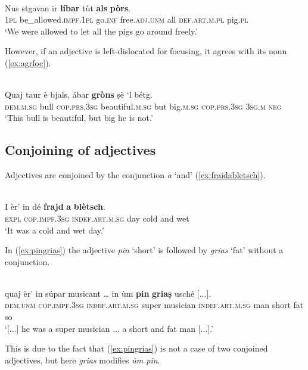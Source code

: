 \ea
\label{ex:noagr:7}
\\
\gll Nus stgavan ir \textbf{líbar} tùt \textbf{als} \textbf{pòrs}.   \\
 \textsc{1pl} be\_allowed.\textsc{impf.1pl}  go.\textsc{inf} free.\textsc{adj.unm} all  \textsc{def.art.m.pl} pig.\textsc{pl} \\
\glt `We were allowed to let all the pigs go around freely.'
\z

However, if an adjective is left-dislocated for focusing, it agrees with its noun (\ref{ex:agrfoc}).

\ea
\label{ex:agrfoc}
\\
\gll Quaj taur è bjals, ábar \textbf{gròns} ṣè `l bétg.\\
\textsc{dem.m.sg} bull \textsc{cop.prs.3sg} beautiful.\textsc{m.sg} but big.\textsc{m.sg} \textsc{cop.prs.3sg} \textsc{3sg.m} \textsc{neg}\\
\glt `This bull is beautiful, but big he is not.'
\z

\subsection{Conjoining of adjectives}
Adjectives are conjoined by the conjunction \textit{a} `and' (\ref{ex:fraidabletsch}).

\ea
\label{ex:fraidabletsch}
\\
\gll I èr' in dé \textbf{frajd} \textbf{a} \textbf{blètsch}.\\
\textsc{expl} \textsc{cop.impf.3sg} \textsc{indef.art.m.sg} day cold and wet\\
\glt `It was a cold and wet day.'
\z

In (\ref{ex:pingrias}) the adjective \textit{pin} `short' is followed by \textit{grias} `fat' without a conjunction.

\ea
\label{ex:pingrias}
\\
	\gll [...] quaj èr’ in súpar musicant … in ùm \textbf{pin} \textbf{griaṣ} usché [...].\\
{} \textsc{dem.unm} \textsc{cop.impf.3sg} \textsc{indef.art.m.sg} super musician {} \textsc{indef.art.m.sg} man short fat so \\
\glt `[...] he was a super musician ... a short and fat man [...].'
\z

This is due to the fact that (\ref{ex:pingrias}) is not a case of two conjoined adjectives, but here \textit{grias} modifies \textit{ùm pin}.

